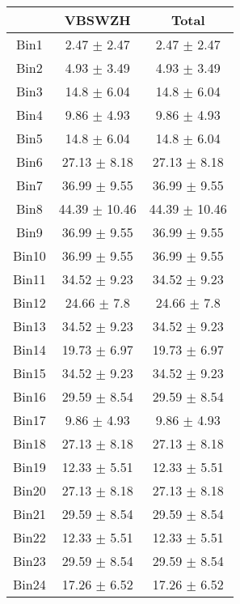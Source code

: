   \begin{tabular}{|c|c|c|}
  \hline
      & VBSWZH & Total \\ \cline{1-3} 
     \hline\hline
     Bin1 & 2.47 $\pm$ 2.47 & 2.47 $\pm$ 2.47 \\ \cline{1-3} 
     Bin2 & 4.93 $\pm$ 3.49 & 4.93 $\pm$ 3.49 \\ \cline{1-3} 
     Bin3 & 14.8 $\pm$ 6.04 & 14.8 $\pm$ 6.04 \\ \cline{1-3} 
     Bin4 & 9.86 $\pm$ 4.93 & 9.86 $\pm$ 4.93 \\ \cline{1-3} 
     Bin5 & 14.8 $\pm$ 6.04 & 14.8 $\pm$ 6.04 \\ \cline{1-3} 
     Bin6 & 27.13 $\pm$ 8.18 & 27.13 $\pm$ 8.18 \\ \cline{1-3} 
     Bin7 & 36.99 $\pm$ 9.55 & 36.99 $\pm$ 9.55 \\ \cline{1-3} 
     Bin8 & 44.39 $\pm$ 10.46 & 44.39 $\pm$ 10.46 \\ \cline{1-3} 
     Bin9 & 36.99 $\pm$ 9.55 & 36.99 $\pm$ 9.55 \\ \cline{1-3} 
     Bin10 & 36.99 $\pm$ 9.55 & 36.99 $\pm$ 9.55 \\ \cline{1-3} 
     Bin11 & 34.52 $\pm$ 9.23 & 34.52 $\pm$ 9.23 \\ \cline{1-3} 
     Bin12 & 24.66 $\pm$ 7.8 & 24.66 $\pm$ 7.8 \\ \cline{1-3} 
     Bin13 & 34.52 $\pm$ 9.23 & 34.52 $\pm$ 9.23 \\ \cline{1-3} 
     Bin14 & 19.73 $\pm$ 6.97 & 19.73 $\pm$ 6.97 \\ \cline{1-3} 
     Bin15 & 34.52 $\pm$ 9.23 & 34.52 $\pm$ 9.23 \\ \cline{1-3} 
     Bin16 & 29.59 $\pm$ 8.54 & 29.59 $\pm$ 8.54 \\ \cline{1-3} 
     Bin17 & 9.86 $\pm$ 4.93 & 9.86 $\pm$ 4.93 \\ \cline{1-3} 
     Bin18 & 27.13 $\pm$ 8.18 & 27.13 $\pm$ 8.18 \\ \cline{1-3} 
     Bin19 & 12.33 $\pm$ 5.51 & 12.33 $\pm$ 5.51 \\ \cline{1-3} 
     Bin20 & 27.13 $\pm$ 8.18 & 27.13 $\pm$ 8.18 \\ \cline{1-3} 
     Bin21 & 29.59 $\pm$ 8.54 & 29.59 $\pm$ 8.54 \\ \cline{1-3} 
     Bin22 & 12.33 $\pm$ 5.51 & 12.33 $\pm$ 5.51 \\ \cline{1-3} 
     Bin23 & 29.59 $\pm$ 8.54 & 29.59 $\pm$ 8.54 \\ \cline{1-3} 
     Bin24 & 17.26 $\pm$ 6.52 & 17.26 $\pm$ 6.52 \\ \cline{1-3} 

\end{tabular}
